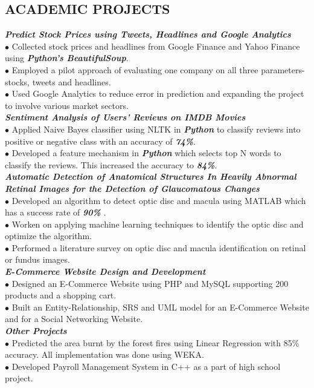 \documentclass[10.5pt]{article}
\begin{document}
\subsection*{ACADEMIC PROJECTS}
\vspace{-3pt}
{\it {\bf Predict Stock Prices using Tweets, Headlines and Google Analytics}}
\\
$\bullet$ Collected stock prices and headlines from Google Finance and Yahoo Finance using {\it {\bf Python's BeautifulSoup}}.
\\
$\bullet$ Employed a pilot approach of evaluating one company on all three parameters- stocks, tweets and headlines.
\\
$\bullet$ Used Google Analytics to reduce error in prediction and expanding the project to involve various market sectors.
\\[0.06in]
{\it {\bf Sentiment Analysis of Users' Reviews on IMDB Movies}}
\\
$\bullet$ Applied Naive Bayes classifier using NLTK in  {\it {\bf Python}} to classify reviews into positive or negative class with an accuracy of {\it {\bf 74\%}}.
\\
$\bullet$ Developed a feature mechanism in {\it {\bf Python}} which selects top N words to classify the reviews. This increased the accuracy to {\it {\bf 84\%}}.
\\[0.06in]
{\it {\bf Automatic Detection of Anatomical Structures In Heavily Abnormal Retinal Images for the Detection of  Glaucomatous Changes}}
\\
$\bullet$ Developed an algorithm to detect optic disc and macula using MATLAB which has a success rate of {\it{\bf 90\% }}. 
\\
$\bullet$ Worken on applying machine learning techniques to identify the optic disc and optimize the algorithm. 
\\
$\bullet$ Performed a literature survey on optic disc and macula identification on retinal or fundus images.
\\[0.06in]
{\it {\bf E-Commerce Website Design and Development}}
\\
$\bullet$ Designed an E-Commerce Website using PHP and MySQL supporting 200 products and a shopping cart. 
\\
$\bullet$ Built an Entity-Relationship, SRS and UML model for an E-Commerce Website and for a Social Networking Website. 
\\[0.06in]
{\it {\bf Other Projects}}
\\
$\bullet$ Predicted the area burnt by the forest fires using Linear Regression with 85\% accuracy. All implementation was done using WEKA.
\\
$\bullet$ Developed  Payroll Management System in C++ as a part of high school project.
\end{document}
